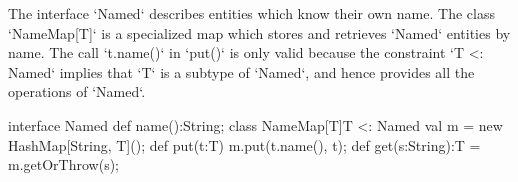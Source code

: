 \begin{ex}
The interface \xcd`Named` describes entities which know their own name.  The
class \xcd`NameMap[T]` is a specialized map which stores and retrieves
\xcd`Named` entities by name.  The call \xcd`t.name()` in \xcd`put()` is only
valid because the constraint \xcd`{T <: Named}` implies that \xcd`T` is a
subtype of \xcd`Named`, and hence provides all the operations of \xcd`Named`. 
\begin{xten}
interface Named { def name():String; }
class NameMap[T]{T <: Named} {
   val m = new HashMap[String, T]();
   def put(t:T) { m.put(t.name(), t); }
   def get(s:String):T = m.getOrThrow(s);
}
\end{xten}
%


\end{ex}


